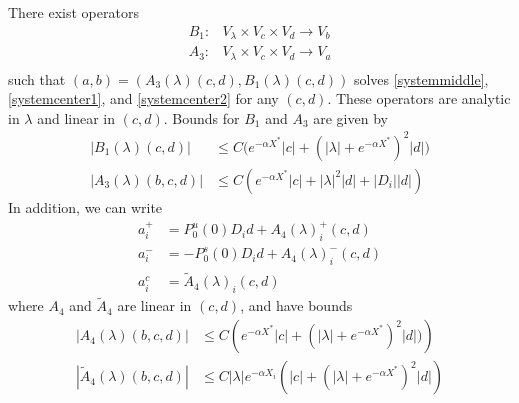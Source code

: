 \documentclass[thesis.tex]{subfiles}
\begin{document}
\begin{lemma}\label{Zinv2}
There exist operators
\begin{align*}
B_1: &V_\lambda \times V_c \times V_d \rightarrow V_b \\
A_3: &V_\lambda \times V_c \times V_d \rightarrow V_a \\
\end{align*}
such that $( a, b ) = ( A_3(\lambda)(c, d), B_1(\lambda)(c, d) )$ solves \eqref{systemmiddle}, \eqref{systemcenter1}, and \eqref{systemcenter2} for any $(c, d)$. These operators are analytic in $\lambda$ and linear in $(c, d)$. Bounds for $B_1$ and $A_3$ are given by
\begin{align}
|B_1(\lambda)(c, d)| &\leq C\Big( e^{-\alpha X^*}|c| + (|\lambda| + e^{-\alpha X^*})^2 |d| \Big) \label{B1bound} \\
|A_3(\lambda)(b, c, d)| &\leq C \left( e^{-\alpha X^*} |c| + |\lambda|^2 |d| + |D_i||d| \right) \label{A3bound} 
\end{align} 
In addition, we can write
\begin{align*}
a_i^+ &= P_0^u(0) D_i d + A_4(\lambda)_i^+(c, d) \\
a_i^- &= -P_0^s(0) D_i d + A_4(\lambda)_i^-(c, d) \\
a_i^c &= \tilde{A}_4(\lambda)_i(c, d) 
\end{align*}
where $A_4$ and $\tilde{A}_4$ are linear in $(c, d)$, and have bounds
\begin{align}
|A_4(\lambda)(b, c, d)|
&\leq C \left( e^{-\alpha X^*}|c| + (|\lambda| + e^{-\alpha X^*})^2 |d| ) \right)  \label{A4bound} \\
|\tilde{A}_4(\lambda)(b, c, d)| &\leq C |\lambda| e^{-\alpha X_i} \left( |c| + (|\lambda| + e^{-\alpha X^*})^2  |d| \right) \label{tildeA4bound}
\end{align}


\end{lemma}
\end{document}
